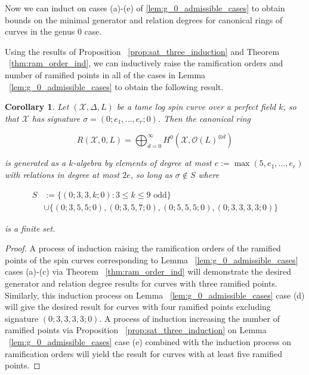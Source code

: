 \documentclass{amsart}
\theoremstyle{plain}
\newtheorem{cor}[thm]{Corollary}
\theoremstyle{definition}
\theoremstyle{remark}
\numberwithin{equation}{section}
\newcommand \sx{\mathscr X}
\newcommand\sco{{\mathscr O}}
\begin{document}
Now we can induct on cases (a)-(e) of \ref{lem:g_0_admissible_cases}
to obtain bounds on the minimal generator and relation degrees for
canonical rings of curves in the genus 0 case.

Using the results of Proposition ~\ref{prop:sat_three_induction}
and Theorem ~\ref{thm:ram_order_ind}, we can inductively raise
the ramification orders and number of ramified points in all of the
cases in Lemma ~\ref{lem:g_0_admissible_cases} to obtain the following
result.

\begin{cor}
\label{cor:g_0_gen_rel_base_cases}
Let $(\sx, \Delta, L)$ be a tame log spin curve over a perfect field $k$, so
that $\sx$ has signature $\sigma = (0; e_1, \ldots, e_r; 0)$. Then the
canonical ring

\[
	R(\sx, 0, L) = \bigoplus_{d = 0}^\infty H^0(\sx, \sco(L)^{\otimes d})
\]

\noindent
is generated as a $k$-algebra by elements of degree at most $e := 
\max(5, e_1, \ldots, e_r)$ with relations in degree at most $2e$, so 
long as $\sigma \notin S$ where

\begin{align*}
	S &:= \{(0; 3, 3, k; 0) : 3 \leq k \leq 9 \text{ odd}\} \\
		&\cup \{(0; 3, 5, 5; 0) ,(0; 3, 5, 7; 0), (0; 5, 5, 5; 0), (0; 3, 3, 3, 3; 0)\}
\end{align*}

\noindent
is a finite set.
\end{cor}

\begin{proof}
A process of induction raising the ramification orders of
the ramified points of the spin curves corresponding to Lemma
~\ref{lem:g_0_admissible_cases} cases (a)-(c) via Theorem
~\ref{thm:ram_order_ind} will demonstrate the desired generator and
relation degree results for curves with three ramified points.
Similarly, this induction process on Lemma
~\ref{lem:g_0_admissible_cases} case (d) will give the desired
result for curves with four ramified points excluding signature
$(0; 3, 3, 3, 3; 0)$. A process of induction increasing the
number of ramified points via Proposition
~\ref{prop:sat_three_induction} on Lemma ~\ref{lem:g_0_admissible_cases}
case (e) combined with the induction process on ramification orders
will yield the result for curves with at least five ramified points.
\end{proof}
\end{document}

